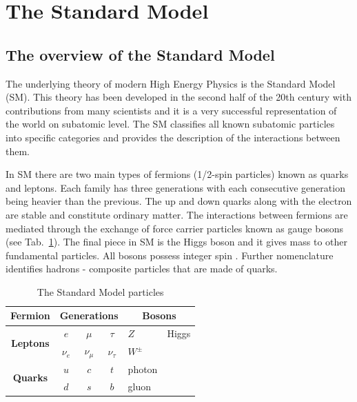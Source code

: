 \section{The Standard Model}
\label{SM}
\subsection{The overview of the Standard Model}
The underlying theory of modern High Energy Physics is the Standard Model (SM). This theory has been developed in the second half of the 20th century with contributions from many scientists and it is a very successful representation of the world on subatomic level.
The SM classifies all known subatomic particles into specific categories and provides the description of the interactions between them. 

In SM there are two main types of fermions (1/2-spin particles) known as quarks and leptons. Each family has three generations with each consecutive generation being heavier than the previous. The up and down quarks along with the electron are stable and constitute ordinary matter. The interactions between fermions are mediated through the exchange of force carrier particles known as gauge bosons (see Tab.~\ref{tab:SM}). The final piece in SM is the Higgs boson and it gives mass to other fundamental particles. All bosons possess integer spin \citep{martin2006nuclear}. Further nomenclature identifies hadrons - composite particles that are made of quarks.
\begin{table}[]
\centering
\label{my-label}
\begin{tabular}{cccc | ll}
\textbf{Fermion}                  & \multicolumn{3}{c}{\textbf{Generations}} & \multicolumn{2}{c}{\textbf{Bosons}} \\ \hline
\multirow{2}{*}{\textbf{Leptons}} & $e$        & $\mu$        & $\tau$       & $Z$            & Higgs           \\
                                  & $\nu_{e}$  & $\nu_{\mu}$  & $\nu_{\tau}$ & $W^{\pm}$            &                 \\ 
\multirow{2}{*}{\textbf{Quarks}}  & $u$        & $c$          & $t$          & photon            &                 \\
                                  & $d$        & $s$          & $b$          & gluon             &          \\ \hline      
\end{tabular}
\caption{The Standard Model particles}
\label{tab:SM}
\end{table}

